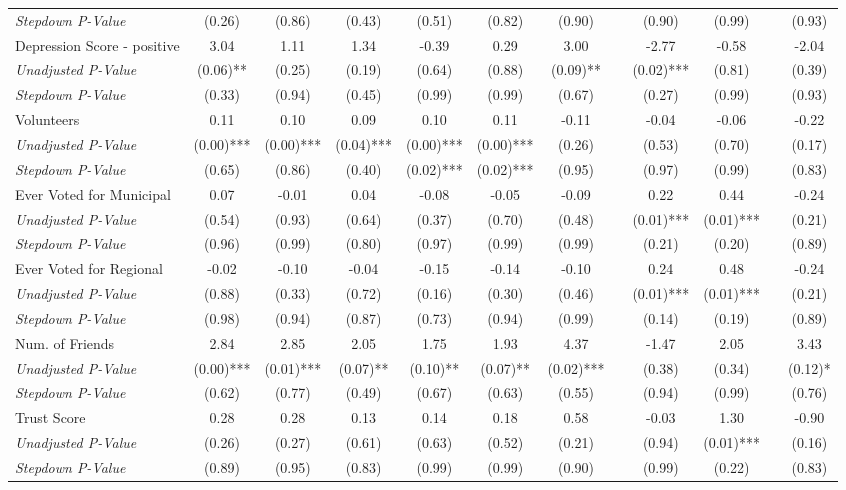 \begin{tabular}{l c c c c c c c c c c c}
\quad \textit{Stepdown P-Value} & (0.26) & (0.86) & (0.43) & (0.51) & (0.82) & (0.90) & & (0.90) & (0.99) & & (0.93) \\
Depression Score - positive & 3.04 & 1.11 & 1.34 & -0.39 & 0.29 & 3.00 & & -2.77 & -0.58 & & -2.04 \\
\quad \textit{Unadjusted P-Value} & (0.06)** & (0.25) & (0.19) & (0.64) & (0.88) & (0.09)** & & (0.02)*** & (0.81) & & (0.39) \\
\quad \textit{Stepdown P-Value} & (0.33) & (0.94) & (0.45) & (0.99) & (0.99) & (0.67) & & (0.27) & (0.99) & & (0.93) \\
Volunteers & 0.11 & 0.10 & 0.09 & 0.10 & 0.11 & -0.11 & & -0.04 & -0.06 & & -0.22 \\
\quad \textit{Unadjusted P-Value} & (0.00)*** & (0.00)*** & (0.04)*** & (0.00)*** & (0.00)*** & (0.26) & & (0.53) & (0.70) & & (0.17) \\
\quad \textit{Stepdown P-Value} & (0.65) & (0.86) & (0.40) & (0.02)*** & (0.02)*** & (0.95) & & (0.97) & (0.99) & & (0.83) \\
Ever Voted for Municipal & 0.07 & -0.01 & 0.04 & -0.08 & -0.05 & -0.09 & & 0.22 & 0.44 & & -0.24 \\
\quad \textit{Unadjusted P-Value} & (0.54) & (0.93) & (0.64) & (0.37) & (0.70) & (0.48) & & (0.01)*** & (0.01)*** & & (0.21) \\
\quad \textit{Stepdown P-Value} & (0.96) & (0.99) & (0.80) & (0.97) & (0.99) & (0.99) & & (0.21) & (0.20) & & (0.89) \\
Ever Voted for Regional & -0.02 & -0.10 & -0.04 & -0.15 & -0.14 & -0.10 & & 0.24 & 0.48 & & -0.24 \\
\quad \textit{Unadjusted P-Value} & (0.88) & (0.33) & (0.72) & (0.16) & (0.30) & (0.46) & & (0.01)*** & (0.01)*** & & (0.21) \\
\quad \textit{Stepdown P-Value} & (0.98) & (0.94) & (0.87) & (0.73) & (0.94) & (0.99) & & (0.14) & (0.19) & & (0.89) \\
Num. of Friends & 2.84 & 2.85 & 2.05 & 1.75 & 1.93 & 4.37 & & -1.47 & 2.05 & & 3.43 \\
\quad \textit{Unadjusted P-Value} & (0.00)*** & (0.01)*** & (0.07)** & (0.10)** & (0.07)** & (0.02)*** & & (0.38) & (0.34) & & (0.12)* \\
\quad \textit{Stepdown P-Value} & (0.62) & (0.77) & (0.49) & (0.67) & (0.63) & (0.55) & & (0.94) & (0.99) & & (0.76) \\
Trust Score & 0.28 & 0.28 & 0.13 & 0.14 & 0.18 & 0.58 & & -0.03 & 1.30 & & -0.90 \\
\quad \textit{Unadjusted P-Value} & (0.26) & (0.27) & (0.61) & (0.63) & (0.52) & (0.21) & & (0.94) & (0.01)*** & & (0.16) \\
\quad \textit{Stepdown P-Value} & (0.89) & (0.95) & (0.83) & (0.99) & (0.99) & (0.90) & & (0.99) & (0.22) & & (0.83) \\
\bottomrule
\end{tabular}
